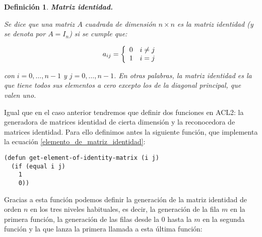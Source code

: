 \documentclass[a4paper,10pt]{article}
\newtheorem{defi}{{Definición}}
\begin{document}
\begin{defi} \textbf{Matriz identidad.}\vspace{8pt}\par
Se dice que una matriz $A$ cuadrada de dimensión $n \times n$ es la \emph{matriz identidad} (y se denota por $A=I_n$) si se cumple que:

\begin{equation} 
a_{ij} = \left\{\begin{array}{c l} 0 & i \neq j\\ 1 & i = j\end{array}\right.
\label{elemento_de_matriz_identidad}
\end{equation}
 
\par \vspace{10pt}

con $i = 0, \dots, n-1$ y $j = 0, \dots, n-1$. En otras palabras, la matriz identidad es la que tiene todos sus elementos a cero excepto los de la diagonal principal, que valen uno.
\end{defi}

\par \vspace{10pt}

Igual que en el caso anterior tendremos que definir dos funciones en ACL2: la generadora de matrices identidad de cierta dimensión y la reconocedora de matrices identidad. Para ello definimos antes la siguiente función, que implementa la ecuación \ref{elemento_de_matriz_identidad}:

\par \vspace{10pt}		

\begin{lstlisting}[language=clips]
(defun get-element-of-identity-matrix (i j)
  (if (equal i j)	
    1	
    0))
\end{lstlisting}

\par \vspace{10pt}		

Gracias a esta función podemos definir la generación de la matriz identidad de orden $n$ en los tres niveles habituales, es decir, la generación de la fila $m$ en la primera función, la generación de las filas desde la 0 hasta la $m$ en la segunda función y la que lanza la primera llamada a esta última función:

\par \vspace{10pt}		
\end{document}
